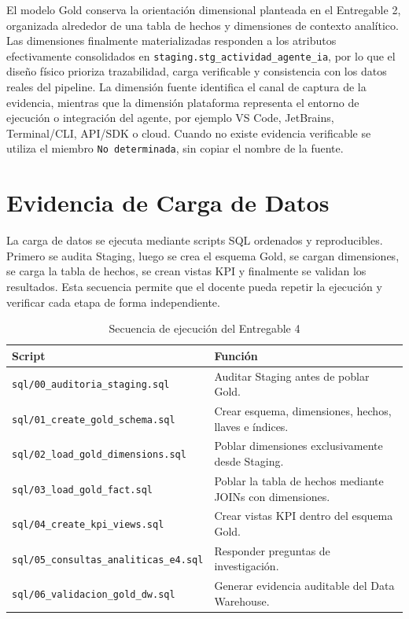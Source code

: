 \documentclass[12pt,a4paper]{article}
\newcommand{\StagingTabla}{\texttt{staging.\allowbreak stg\_actividad\_\allowbreak agente\_ia}}
\newcommand{\pathcode}[1]{\begingroup\scriptsize\ttfamily\nolinkurl{#1}\endgroup}
\begin{document}
El modelo Gold conserva la orientaci\'on dimensional planteada en el Entregable 2, organizada alrededor de una tabla de hechos y dimensiones de contexto anal\'itico. Las dimensiones finalmente materializadas responden a los atributos efectivamente consolidados en \StagingTabla{}, por lo que el dise\~no f\'isico prioriza trazabilidad, carga verificable y consistencia con los datos reales del pipeline. La dimensi\'on fuente identifica el canal de captura de la evidencia, mientras que la dimensi\'on plataforma representa el entorno de ejecuci\'on o integraci\'on del agente, por ejemplo VS Code, JetBrains, Terminal/CLI, API/SDK o cloud. Cuando no existe evidencia verificable se utiliza el miembro \texttt{No determinada}, sin copiar el nombre de la fuente.

\section{Evidencia de Carga de Datos}

La carga de datos se ejecuta mediante scripts SQL ordenados y reproducibles. Primero se audita Staging, luego se crea el esquema Gold, se cargan dimensiones, se carga la tabla de hechos, se crean vistas KPI y finalmente se validan los resultados. Esta secuencia permite que el docente pueda repetir la ejecuci\'on y verificar cada etapa de forma independiente.

\begin{table}[H]
\centering
\footnotesize
{}
\begin{tabular}{|P{5.1cm}|P{8.2cm}|}
\hline
{}
\textbf{Script} & \textbf{Funci\'on} \\ \hline
\pathcode{sql/00_auditoria_staging.sql} & Auditar Staging antes de poblar Gold. \\ \hline
\pathcode{sql/01_create_gold_schema.sql} & Crear esquema, dimensiones, hechos, llaves e \'indices. \\ \hline
\pathcode{sql/02_load_gold_dimensions.sql} & Poblar dimensiones exclusivamente desde Staging. \\ \hline
\pathcode{sql/03_load_gold_fact.sql} & Poblar la tabla de hechos mediante JOINs con dimensiones. \\ \hline
\pathcode{sql/04_create_kpi_views.sql} & Crear vistas KPI dentro del esquema Gold. \\ \hline
\pathcode{sql/05_consultas_analiticas_e4.sql} & Responder preguntas de investigaci\'on. \\ \hline
\pathcode{sql/06_validacion_gold_dw.sql} & Generar evidencia auditable del Data Warehouse. \\ \hline
\end{tabular}
\caption{Secuencia de ejecuci\'on del Entregable 4}
\end{table}
\end{document}
